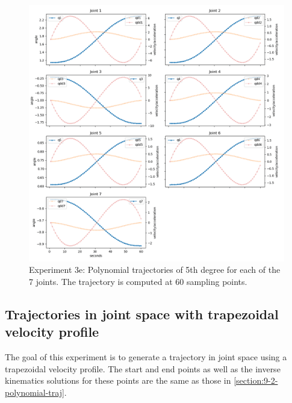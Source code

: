 \begin{center}
\begin{figure}[H]
\centering
\includegraphics[width=\textwidth]{images/robot_planner3/3e_joint_polynomial.png}
\caption{Experiment 3e: Polynomial trajectories of 5th degree for each of the 7 joints. The trajectory is computed at 60 sampling points.}
\label{robot-planner3e-joint-polynomial}
\end{figure}
\end{center}


\subsection{Trajectories in joint space with trapezoidal velocity profile}

The goal of this experiment is to generate a trajectory in joint space using a trapezoidal velocity profile. The start and end points as well as the inverse kinematics solutions for these points are the same as those 
in \ref{section:9-2-polynomial-traj}.

